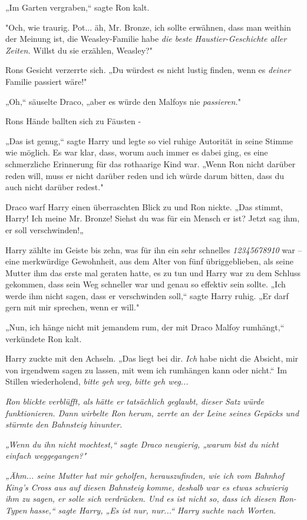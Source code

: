 {„Im Garten vergraben,“ sagte Ron kalt.

"Och, wie traurig. Pot... äh, Mr. Bronze, ich sollte erwähnen, dass man weithin der Meinung ist, die Weasley-Familie habe \emph{die beste Haustier-Geschichte aller Zeiten.} Willst du sie erzählen, Weasley?"

Rons Gesicht verzerrte sich. „Du würdest es nicht lustig finden, wenn es \emph{deiner} Familie passiert wäre!"

„Oh,“ säuselte Draco, „aber es würde den Malfoys nie \emph{passieren.}"

Rons Hände ballten sich zu Fäusten -

„Das ist genug,“ sagte Harry und legte so viel ruhige Autorität in seine Stimme wie möglich. Es war klar, dass, worum auch immer es dabei ging, es eine schmerzliche Erinnerung für das rothaarige Kind war. „Wenn Ron nicht darüber reden will, muss er nicht darüber reden und ich würde darum bitten, dass du auch nicht darüber redest."

Draco warf Harry einen überraschten Blick zu und Ron nickte. „Das stimmt, Harry! Ich meine Mr. Bronze! Siehst du was für ein Mensch er ist? Jetzt sag ihm, er soll verschwinden!„

Harry zählte im Geiste bis zehn, was für ihn ein sehr schnelles \emph{12345678910} war -- eine merkwürdige Gewohnheit, aus dem Alter von fünf übriggeblieben, als seine Mutter ihm das erste mal geraten hatte, es zu tun und Harry war zu dem Schluss gekommen, dass sein Weg schneller war und genau so effektiv sein sollte. „Ich werde ihm nicht sagen, dass er verschwinden soll,“ sagte Harry ruhig. „Er darf gern mit mir sprechen, wenn er will."

„Nun, ich hänge nicht mit jemandem rum, der mit Draco Malfoy rumhängt,“ verkündete Ron kalt.

Harry zuckte mit den Achseln. „Das liegt bei dir. \emph{Ich} habe nicht die Absicht, mir von irgendwem sagen zu lassen, mit wem ich rumhängen kann oder nicht.“ Im Stillen wiederholend, \emph{bitte geh weg, bitte geh weg...}

\emph{Ron blickte verblüfft, als hätte er} \emph{tatsächlich geglaubt, dieser Satz würde funktionieren. Dann wirbelte Ron herum, zerrte an der Leine seines Gepäcks und stürmte den Bahnsteig hinunter.}

\emph{„Wenn du ihn nicht mochtest,“ sagte Draco neugierig, „warum bist du nicht einfach weggegangen?"}

\emph{„Ähm... seine Mutter hat mir geholfen, herauszufinden, wie ich vom Bahnhof King's Cross aus auf diesen Bahnsteig komme, deshalb war es etwas schwierig ihm zu sagen, er solle sich verdrücken. Und es ist nicht so, dass ich diesen Ron-Typen} \emph{\emph{hasse},“ sagte Harry, „Es ist nur, nur...“ Harry suchte nach Worten.}

}
